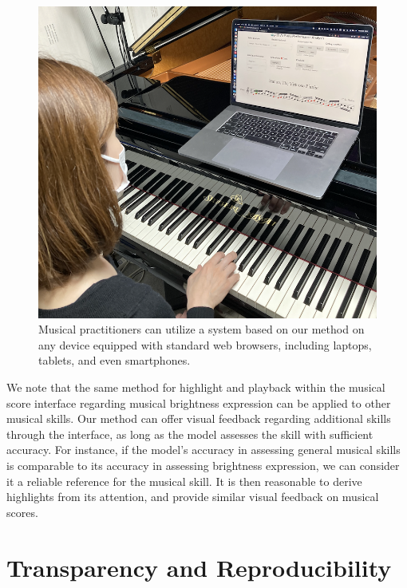 \documentclass[sigconf,review,anonymous]{acmart}
\begin{document}
\begin{figure}[h!]
  \centering
  \includegraphics[width=\linewidth]{figures/system_usage_2224.png}
  \caption{Musical practitioners can utilize a system based on our method on any device equipped with standard web browsers, including laptops, tablets, and even smartphones.}
  \label{system_usage}
\end{figure}

We note that the same method for highlight and playback within the musical score interface regarding musical brightness expression can be applied to other musical skills. 
Our method can offer visual feedback regarding additional skills through the interface, as long as the model assesses the skill with sufficient accuracy. 
For instance, if the model's accuracy in assessing general musical skills is comparable to its accuracy in assessing brightness expression, we can consider it a reliable reference for the musical skill.
It is then reasonable to derive highlights from its attention, and provide similar visual feedback on musical scores.

\section{Transparency and Reproducibility}
\end{document}
